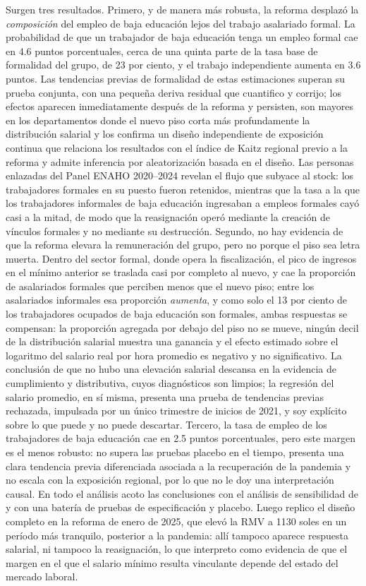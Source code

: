 Surgen tres resultados. Primero, y de manera más robusta, la reforma desplazó la \emph{composición} del empleo de baja educación lejos del trabajo asalariado formal. La probabilidad de que un trabajador de baja educación tenga un empleo formal cae en 4.6 puntos porcentuales, cerca de una quinta parte de la tasa base de formalidad del grupo, de 23 por ciento, y el trabajo independiente aumenta en 3.6 puntos. Las tendencias previas de formalidad de estas estimaciones superan su prueba conjunta, con una pequeña deriva residual que cuantifico y corrijo; los efectos aparecen inmediatamente después de la reforma y persisten, son mayores en los departamentos donde el nuevo piso corta más profundamente la distribución salarial y los confirma un diseño independiente de exposición continua que relaciona los resultados con el índice de Kaitz regional previo a la reforma y admite inferencia por aleatorización basada en el diseño. Las personas enlazadas del Panel ENAHO 2020--2024 revelan el flujo que subyace al stock: los trabajadores formales en su puesto fueron retenidos, mientras que la tasa a la que los trabajadores informales de baja educación ingresaban a empleos formales cayó casi a la mitad, de modo que la reasignación operó mediante la creación de vínculos formales y no mediante su destrucción. Segundo, no hay evidencia de que la reforma elevara la remuneración del grupo, pero no porque el piso sea letra muerta. Dentro del sector formal, donde opera la fiscalización, el pico de ingresos en el mínimo anterior se traslada casi por completo al nuevo, y cae la proporción de asalariados formales que perciben menos que el nuevo piso; entre los asalariados informales esa proporción \emph{aumenta}, y como solo el 13 por ciento de los trabajadores ocupados de baja educación son formales, ambas respuestas se compensan: la proporción agregada por debajo del piso no se mueve, ningún decil de la distribución salarial muestra una ganancia y el efecto estimado sobre el logaritmo del salario real por hora promedio es negativo y no significativo. La conclusión de que no hubo una elevación salarial descansa en la evidencia de cumplimiento y distributiva, cuyos diagnósticos son limpios; la regresión del salario promedio, en sí misma, presenta una prueba de tendencias previas rechazada, impulsada por un único trimestre de inicios de 2021, y soy explícito sobre lo que puede y no puede descartar. Tercero, la tasa de empleo de los trabajadores de baja educación cae en 2.5 puntos porcentuales, pero este margen es el menos robusto: no supera las pruebas placebo en el tiempo, presenta una clara tendencia previa diferenciada asociada a la recuperación de la pandemia y no escala con la exposición regional, por lo que no le doy una interpretación causal. En todo el análisis acoto las conclusiones con el análisis de sensibilidad de \citet{rambachan_roth_2023} y con una batería de pruebas de especificación y placebo. Luego replico el diseño completo en la reforma de enero de 2025, que elevó la RMV a 1130 soles en un período más tranquilo, posterior a la pandemia: allí tampoco aparece respuesta salarial, ni tampoco la reasignación, lo que interpreto como evidencia de que el margen en el que el salario mínimo resulta vinculante depende del estado del mercado laboral.

